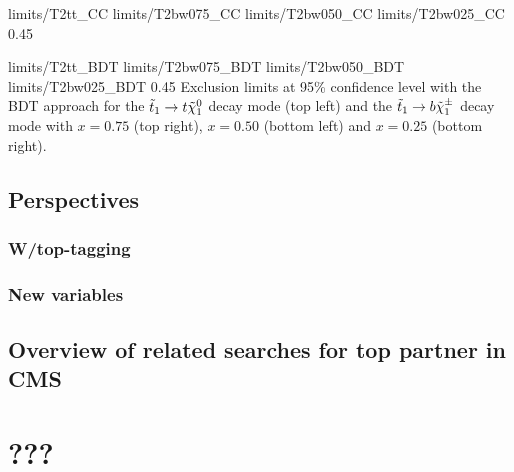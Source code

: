                           {limits/T2tt_CC}
                          {limits/T2bw075_CC}
                          {limits/T2bw050_CC}
                          {limits/T2bw025_CC}
                          {0.45}
                          {}

                          {limits/T2tt_BDT}
                          {limits/T2bw075_BDT}
                          {limits/T2bw050_BDT}
                          {limits/T2bw025_BDT}
                          {0.45}
                          {Exclusion limits at 95\% confidence level with the BDT approach for the $\tilde{t}_1 \rightarrow t \tilde{\chi}_1^0$ decay mode (top left) and the $\tilde{t}_1 \rightarrow b \tilde{\chi}_1^\pm$ decay mode with $x=0.75$ (top right), $x=0.50$ (bottom left) and $x=0.25$ (bottom right). }
    \newpage

    \section{Perspectives \label{sec:analysis_perspective}}
        \loremipsum
        \subsection{W/top-tagging}
        \loremipsum
        \subsection{New variables}
        \loremipsum
    
    \section{Overview of related searches for top partner in CMS \label{sec:analysis_overviewStopSearches}}
        \loremipsum

















\chapter{???}
        \loremipsum



        \loremipsum




